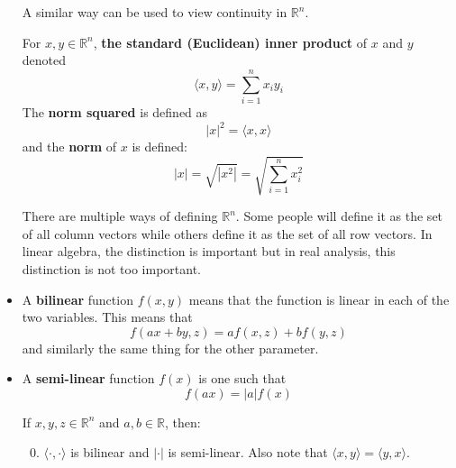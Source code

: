 \begin{itemize}
    A similar way can be used to view continuity in $\mathbb{R}^n.$
    \begin{definition}
        For $x,y\in \mathbb{R}^n$, \textbf{the standard (Euclidean) inner product} of $x$ and $y$ denoted 
        \begin{equation}
            \langle x,y\rangle = \sum_{i=1}^n x_iy_i
        \end{equation}
        The \textbf{norm squared} is defined as
        \begin{equation}
            |x|^2 = \langle x,x\rangle
        \end{equation}
        and the \textbf{norm} of $x$ is defined:
        \begin{equation}
            |x| = \sqrt{|x^2|} = \sqrt{\sum_{i=1}^n x_i^2}
        \end{equation}
    \end{definition}
    \begin{idea}
        There are multiple ways of defining $\mathbb{R}^n$. Some people will define it as the set of all column vectors while others define it as the set of all row vectors. In linear algebra, the distinction is important but in real analysis, this distinction is not too important.
    \end{idea}
    \item A \textbf{bilinear} function $f(x,y)$ means that the function is linear in each of the two variables. This means that
    \begin{equation}
        f(ax+by, z) = af(x,z)+bf(y,z)
    \end{equation}
    and similarly the same thing for the other parameter.
    \item A \textbf{semi-linear} function $f(x)$ is one such that
    \begin{equation}
        f(ax)=|a|f(x)
    \end{equation}
    \begin{proposition}
        If $x,y,z \in \mathbb{R}^n$ and $a,b \in \mathbb{R}$, then:
        \begin{enumerate}
            \setcounter{enumi}{-1}
            \item $\langle \cdot, \cdot \rangle$ is bilinear and $|\cdot |$ is semi-linear. Also note that $\langle x,y\rangle = \langle y,x\rangle.$


\end{enumerate}
\end{proposition}
\end{itemize}
